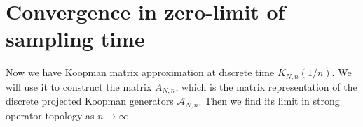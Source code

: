 \documentclass{article}[11]
\begin{document}



\newpage
\section{Convergence in zero-limit of sampling time}
Now we have Koopman matrix approximation at discrete time $K_{N,n}(1/n)$. We will use it to construct the matrix $A_{N,n}$, which is the matrix representation of the discrete projected Koopman generators $\mathcal{A}_{N,n}$. Then we find its limit in strong operator topology as $n\to\infty$. 
\end{document}

